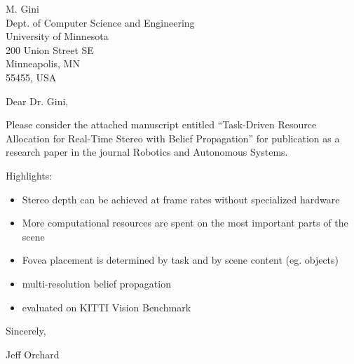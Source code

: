 \documentclass[letterpaper,12pt]{letter}
\begin{document}
\begin{letter}{M. Gini\\
Dept. of Computer Science and Engineering\\
University of Minnesota\\
200 Union Street SE\\
Minneapolis, MN\\
55455, USA}

\opening{Dear Dr. Gini,} %


Please consider the attached manuscript entitled ``Task-Driven Resource Allocation for Real-Time Stereo with Belief Propagation'' for publication as a research paper in the journal Robotics and Autonomous Systems.

Highlights:

\begin{itemize}
\item Stereo depth can be achieved at frame rates without specialized hardware
\item More computational resources are spent on the most important parts of the scene
\item Fovea placement is determined by task and by scene content (eg. objects)
\item multi-resolution belief propagation
\item evaluated on KITTI Vision Benchmark
\end{itemize}



\noindent
Sincerely,


\noindent
Jeff Orchard

\end{letter}
\end{document}
